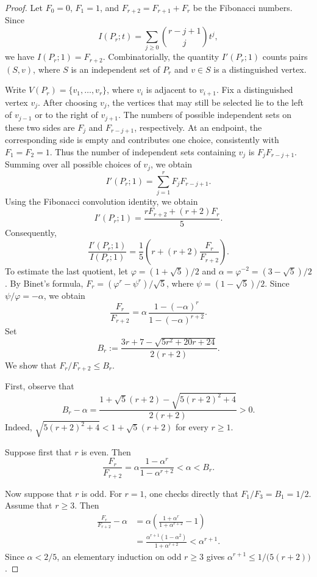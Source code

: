 \documentclass[12pt,twoside]{amsart}
\theoremstyle{definition}
\theoremstyle{mystyle}
\begin{document}
\begin{proof}
Let $F_0=0$, $F_1=1$, and $F_{r+2}=F_{r+1}+F_r$ be the Fibonacci
numbers. Since
\begin{equation*}
I(P_r;t)=\sum_{j\geq0}\binom{r-j+1}{j}t^j,
\end{equation*}
we have $I(P_r;1)=F_{r+2}$. Combinatorially, the quantity $I'(P_r;1)$ counts pairs $(S,v)$, where
$S$ is an independent set of $P_r$ and $v\in S$ is a distinguished vertex.

Write $V(P_r)=\{v_1,\ldots,v_r\}$, where $v_i$ is adjacent to 
$v_{i+1}$. Fix a distinguished vertex $v_j$. After choosing $v_j$,
the vertices that may still be selected lie to the left
of $v_{j-1}$ or to the right of $v_{j+1}$.
The numbers of possible independent sets on these two
sides are $F_j$ and $F_{r-j+1}$, respectively.
At an endpoint, the corresponding side is empty and
contributes one choice, consistently with $F_1=F_2=1$.
Thus the number of independent sets containing $v_j$
is $F_jF_{r-j+1}$. Summing over all possible choices of $v_j$, we obtain
\begin{equation*}
I'(P_r;1)
=
\sum_{j=1}^{r} F_jF_{r-j+1}.
\end{equation*}
Using the Fibonacci convolution identity, we obtain
\begin{equation*}
I'(P_r;1)=\frac{rF_{r+2}+(r+2)F_r}{5}.
\end{equation*}
Consequently,
\[
\frac{I'(P_r;1)}{I(P_r;1)}
=
\frac15\left(r+(r+2)\frac{F_r}{F_{r+2}}\right).
\]
To estimate the last quotient, let
$\varphi=(1+\sqrt5)/2$ and
$\alpha=\varphi^{-2}=(3-\sqrt5)/2$. By Binet's formula,
$F_r=(\varphi^r-\psi^r)/\sqrt5$, where
$\psi=(1-\sqrt5)/2$. Since $\psi/\varphi=-\alpha$, we obtain
\[
\frac{F_r}{F_{r+2}}
=
\alpha\,
\frac{1-(-\alpha)^r}{1-(-\alpha)^{r+2}}.
\]
Set
\[
B_r:=
\frac{3r+7-\sqrt{5r^2+20r+24}}{2(r+2)}.
\]
We show that $F_r/F_{r+2}\leq B_r$.

First, observe that
\[
B_r-\alpha
=
\frac{
1+\sqrt5(r+2)-\sqrt{5(r+2)^2+4}
}{
2(r+2)
}>0.
\]
Indeed, $\sqrt{5(r+2)^2+4}<1+\sqrt5(r+2)$ for every $r\geq1$.

Suppose first that $r$ is even. Then
\[
\frac{F_r}{F_{r+2}}
=
\alpha\frac{1-\alpha^r}{1-\alpha^{r+2}}
<\alpha<B_r.
\]

Now suppose that $r$ is odd. For $r=1$, one checks directly that
$F_1/F_3=B_1=1/2$. Assume that $r\geq3$. Then
\begin{align*}
\frac{F_r}{F_{r+2}}-\alpha
&=
\alpha
\left(
\frac{1+\alpha^r}{1+\alpha^{r+2}}-1
\right)\\
&=
\frac{\alpha^{r+1}(1-\alpha^2)}
     {1+\alpha^{r+2}}
<\alpha^{r+1}.
\end{align*}
Since $\alpha<2/5$, an elementary induction on odd $r\geq3$ gives
$\alpha^{r+1}\leq 1/\bigl(5(r+2)\bigr)$.


\end{proof}
\end{document}

